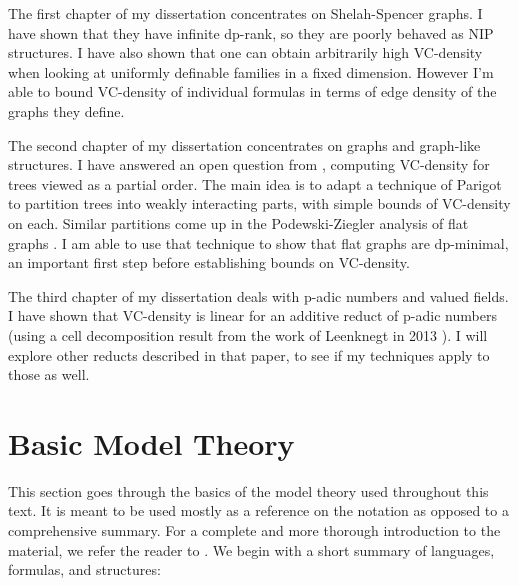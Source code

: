 The first chapter of my dissertation concentrates on Shelah-Spencer graphs. I have shown that they have infinite dp-rank, so they are poorly behaved as NIP structures. I have also shown that one can obtain arbitrarily high VC-density when looking at uniformly definable families in a fixed dimension. However I'm able to bound VC-density of individual formulas in terms of edge density of the graphs they define.

The second chapter of my dissertation concentrates on graphs and graph-like structures. I have answered an open question from \cite{density}, computing VC-density for trees viewed as a partial order. The main idea is to adapt a technique of Parigot \cite{parigot_trees} to partition trees into weakly interacting parts, with simple bounds of VC-density on each. Similar partitions come up in the Podewski-Ziegler analysis of flat graphs \cite {stable_graphs}. I am able to use that technique to show that flat graphs are dp-minimal, an important first step before establishing bounds on VC-density. 

The third chapter of my dissertation deals with p-adic numbers and valued fields. I have shown that VC-density is linear for an additive reduct of p-adic numbers (using a cell decomposition result from the work of Leenknegt in 2013 \cite{reduct}). I will explore other reducts described in that paper, to see if my techniques apply to those as well.

\section{Basic Model Theory}

This section goes through the basics of the model theory used throughout this text.
It is meant to be used mostly as a reference on the notation as opposed to a comprehensive summary.
For a complete and more thorough introduction to the material, we refer the reader to \noref.
We begin with a short summary of languages, formulas, and structures:

